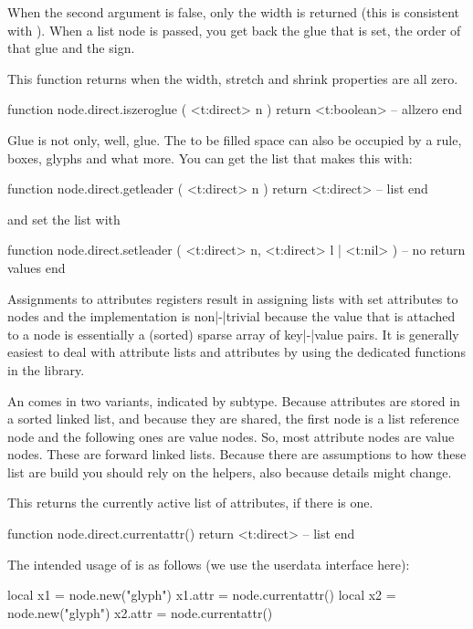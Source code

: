 When the second argument is false, only the width is returned (this is consistent
with ). When a list node is passed, you get back the glue that is
set, the order of that glue and the sign.

This function returns  when the width, stretch and shrink properties
are all zero.

\starttyping[option=LUA]
function node.direct.iszeroglue ( <t:direct> n )
    return <t:boolean> -- allzero
end
\stoptyping

Glue is not only, well, glue. The to be filled space can also be occupied by a rule,
boxes, glyphs and what more. You can get the list that makes this with:

\starttyping[option=LUA]
function node.direct.getleader ( <t:direct> n )
    return <t:direct> -- list
end
\stoptyping

and set the list with

\starttyping[option=LUA]
function node.direct.setleader ( <t:direct> n, <t:direct> l | <t:nil> )
    -- no return values
end
\stoptyping

\stopsubsection

\startsubsection[title={Attributes}]

Assignments to attributes registers result in assigning lists with set attributes
to nodes and the implementation is non|-|trivial because the value that is
attached to a node is essentially a (sorted) sparse array of key|-|value pairs.
It is generally easiest to deal with attribute lists and attributes by using the
dedicated functions in the  library.

An  comes in two variants, indicated by subtype. Because
attributes are stored in a sorted linked list, and because they are shared, the
first node is a list reference node and the following ones are value nodes. So,
most attribute nodes are value nodes. These are forward linked lists. Because
there are assumptions to how these list are build you should rely on the helpers,
also because details might change.

This returns the currently active list of attributes, if there is one.

\starttyping[option=LUA]
function node.direct.currentattr()
    return <t:direct> -- list
end
\stoptyping

The intended usage of  is as follows (we use the userdata
interface here):

\starttyping[option=LUA]
local x1 = node.new("glyph")
x1.attr = node.currentattr()
local x2 = node.new("glyph")
x2.attr = node.currentattr()
\stoptyping

